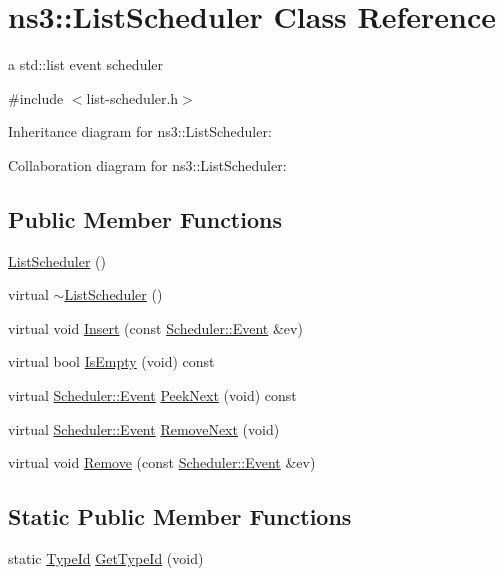 \hypertarget{classns3_1_1ListScheduler}{}\section{ns3\+:\+:List\+Scheduler Class Reference}
\label{classns3_1_1ListScheduler}


a std\+::list event scheduler  




{\ttfamily \#include $<$list-\/scheduler.\+h$>$}



Inheritance diagram for ns3\+:\+:List\+Scheduler\+:


Collaboration diagram for ns3\+:\+:List\+Scheduler\+:
\subsection*{Public Member Functions}
\begin{DoxyCompactItemize}
\item 
\hyperlink{classns3_1_1ListScheduler_a7f747e948e56fddad27918ed64c40ce9}{List\+Scheduler} ()
\item 
virtual \hyperlink{classns3_1_1ListScheduler_a4c1848c7f3ed8f9f25cb2d9295f09460}{$\sim$\+List\+Scheduler} ()
\item 
virtual void \hyperlink{classns3_1_1ListScheduler_a30da19f72a5d50d07592642b55bb6487}{Insert} (const \hyperlink{structns3_1_1Scheduler_1_1Event}{Scheduler\+::\+Event} \&ev)
\item 
virtual bool \hyperlink{classns3_1_1ListScheduler_ae12296e36bc504d92b4c255fbd8faf36}{Is\+Empty} (void) const 
\item 
virtual \hyperlink{structns3_1_1Scheduler_1_1Event}{Scheduler\+::\+Event} \hyperlink{classns3_1_1ListScheduler_aa94f662834df4ddebf7a0935fc28b9d4}{Peek\+Next} (void) const 
\item 
virtual \hyperlink{structns3_1_1Scheduler_1_1Event}{Scheduler\+::\+Event} \hyperlink{classns3_1_1ListScheduler_a3504eb24949d1656d73da9bfc38a2773}{Remove\+Next} (void)
\item 
virtual void \hyperlink{classns3_1_1ListScheduler_af944b2a342f0a8ca1ebef0f387c19ecf}{Remove} (const \hyperlink{structns3_1_1Scheduler_1_1Event}{Scheduler\+::\+Event} \&ev)
\end{DoxyCompactItemize}
\subsection*{Static Public Member Functions}
\begin{DoxyCompactItemize}
\item 
static \hyperlink{classns3_1_1TypeId}{Type\+Id} \hyperlink{classns3_1_1ListScheduler_ae80a20a5870f1e54552ea534875a2aae}{Get\+Type\+Id} (void)
\end{DoxyCompactItemize}
